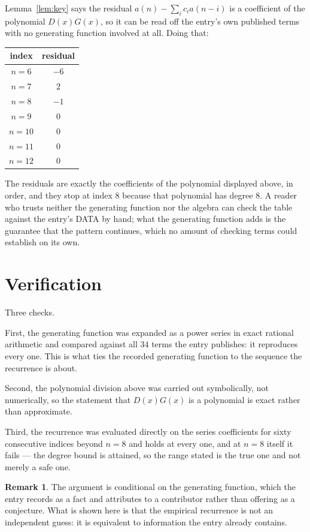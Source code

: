 \documentclass[11pt,a4paper]{article}
\theoremstyle{plain}
\theoremstyle{definition}
\newtheorem{remark}[theorem]{Remark}
\begin{document}
Lemma~\ref{lem:key} says the residual $a(n)-\sum_ic_ia(n-i)$ is a coefficient of the
polynomial $D(x)G(x)$, so it can be read off the entry's own published terms with no
generating function involved at all. Doing that:
\begin{center}
\begin{tabular}{cc}
index & residual \\ \hline
$n=6$ & $-6$ \\
$n=7$ & $2$ \\
$n=8$ & $-1$ \\
$n=9$ & $0$ \\
$n=10$ & $0$ \\
$n=11$ & $0$ \\
$n=12$ & $0$
\end{tabular}
\end{center}
The residuals are exactly the coefficients of the polynomial displayed above, in order, and
they stop at index $8$ because that polynomial has degree $8$. A reader who trusts
neither the generating function nor the algebra can check the table against the entry's DATA
by hand; what the generating function adds is the guarantee that the pattern continues, which
no amount of checking terms could establish on its own.

\section{Verification}

Three checks.

First, the generating function was expanded as a power series in exact rational arithmetic and
compared against all $34$ terms the entry publishes: it reproduces every one. This is
what ties the recorded generating function to the sequence the recurrence is about.

Second, the polynomial division above was carried out symbolically, not numerically, so the
statement that $D(x)G(x)$ is a polynomial is exact rather than approximate.

Third, the recurrence was evaluated directly on the series coefficients for sixty consecutive
indices beyond $n=8$ and holds at every one, and at $n=8$ itself it fails --- the
degree bound is attained, so the range stated is the true one and not merely a safe one.

\begin{remark}
The argument is conditional on the generating function, which the entry records as a fact and
attributes to a contributor rather than offering as a conjecture. What is shown here is that
the empirical recurrence is not an independent guess: it is equivalent to information the
entry already contains.
\end{remark}
\end{document}
